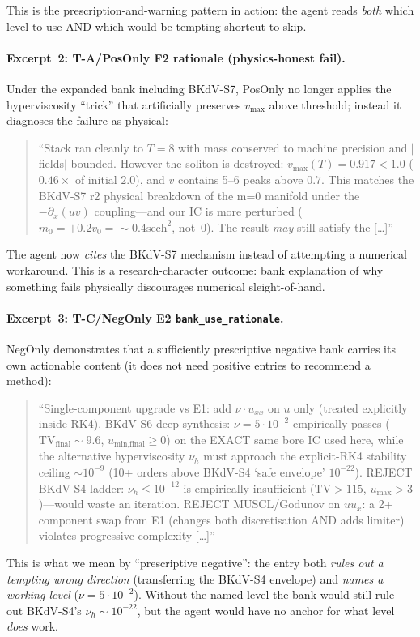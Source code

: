 This is the prescription-and-warning pattern in action: the agent reads
\emph{both} which level to use AND which would-be-tempting shortcut to skip.

\paragraph{Excerpt~2: T-A/PosOnly F2 rationale (physics-honest fail).}
Under the expanded bank including BKdV-S7, PosOnly no longer applies the
hyperviscosity ``trick'' that artificially preserves $v_{\max}$ above
threshold; instead it diagnoses the failure as physical:

\begin{quote}\small
``Stack ran cleanly to $T=8$ with mass conserved to machine precision and
$|$fields$|$ bounded. However the soliton is destroyed:
$v_{\max}(T)=0.917 < 1.0$ ($0.46\times$ of initial $2.0$), and $v$ contains
5--6 peaks above $0.7$. This matches the BKdV-S7 r2 physical breakdown of
the m{=}0 manifold under the $-\partial_x(uv)$ coupling---and our IC is more
perturbed ($m_0 = +0.2 v_0 = {\sim}0.4 \text{sech}^2$, not~0). The result
\emph{may} still satisfy the [\ldots]''
\end{quote}

The agent now \emph{cites} the BKdV-S7 mechanism instead of attempting a
numerical workaround. This is a research-character outcome:
bank explanation of why something fails physically discourages numerical
sleight-of-hand.

\paragraph{Excerpt~3: T-C/NegOnly E2 \texttt{bank\_use\_rationale}.}
NegOnly demonstrates that a sufficiently prescriptive negative bank carries
its own actionable content (it does not need positive entries to recommend
a method):

\begin{quote}\small
``Single-component upgrade vs E1: add $\nu \cdot u_{xx}$ on $u$ only
(treated explicitly inside RK4). BKdV-S6 deep synthesis: $\nu=5\cdot 10^{-2}$
empirically passes ($\text{TV}_\text{final} \sim 9.6$,
$u_\text{min,final} \geq 0$) on the EXACT same bore IC used here, while the
alternative hyperviscosity $\nu_h$ must approach the explicit-RK4 stability
ceiling ${\sim}10^{-9}$ (10+ orders above BKdV-S4 `safe envelope' $10^{-22}$).
REJECT BKdV-S4 ladder: $\nu_h \leq 10^{-12}$ is empirically insufficient
($\text{TV}>115$, $u_\text{max}>3$)---would waste an iteration. REJECT
MUSCL/Godunov on $u u_x$: a 2+ component swap from E1 (changes both
discretisation AND adds limiter) violates progressive-complexity [\ldots]''
\end{quote}

This is what we mean by ``prescriptive negative'': the entry both \emph{rules
out a tempting wrong direction} (transferring the BKdV-S4 envelope) and
\emph{names a working level} ($\nu = 5\cdot 10^{-2}$). Without the named
level the bank would still rule out BKdV-S4's $\nu_h \sim 10^{-22}$, but
the agent would have no anchor for what level \emph{does} work.
